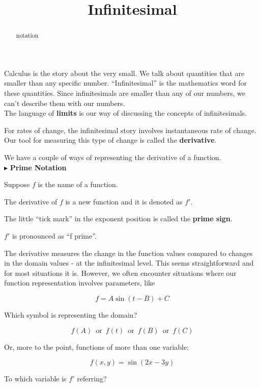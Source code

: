 \documentclass{ximera}
\title{Infinitesimal}
\begin{document}
\begin{abstract}
notation
\end{abstract}
\maketitle




Calculus is the story about the very small.  We talk about quantities that are smaller than any specific number.  ``Infinitesimal'' is the mathematics word for these quantities. Since infinitesimals are smaller than any of our numbers, we can't describe them with our numbers.  \\

The language of \textbf{limits} is our way of discussing the concepts of infinitesimals.  


For rates of change, the infinitesimal story involves instantaneous rate of change.  Our tool for measuring this type of change is called the \textbf{derivative}.

We have a couple of ways of representing the derivative of a function. \\


$\blacktriangleright$  \textbf{\textcolor{purple!85!blue}{Prime Notation}}


Suppose $f$ is the name of a function.

The derivative of $f$ is a new function and it is denoted as \textbf{\textcolor{purple!85!blue}{$f'$}}.

The little ``tick mark'' in the exponent position is called the \textbf{\textcolor{purple!85!blue}{prime sign}}.


$f'$ is pronounced as ``f prime''.


The derivative measures the change in the function values compared to changes in the domain values - at the infinitesimal level. This seems straightforward and for most situations it is.  However, we often encounter situations where our function representation involves parameters, like


\[
f = A \sin(t - B) + C
\]

Which symbol is representing the domain?


\[
f(A)   \, \text{ or } \, f(t)   \, \text{ or } \, f(B)   \, \text{ or } \, f(C)   
\]


Or, more to the point, functions of more than one variable:


\[
f(x, y) = \sin(2x - 3y)
\]

To which variable is $f'$ referring? \\
\end{document}
